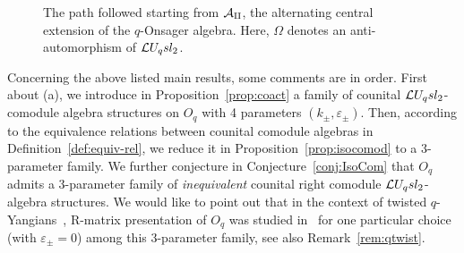 \documentclass[11pt]{amsart}
\numberwithin{equation}{section}
\numberwithin{equation}{section}
\begin{document}
\begin{figure}
	\caption{The path followed starting from $\cal A_q$, the alternating central extension of the $q$-Onsager algebra. Here, $\Omega$ denotes an anti-automorphism of $\mathcal{L} U_q sl_2$.}
		\label{fig:overview}
	\end{figure}
 
Concerning the above listed  main results, some comments are in order. 
First about (a), we introduce in Proposition~\ref{prop:coact} a family of counital $\mathcal{L} U_q sl_2$-comodule algebra structures on $O_q$ with 4 parameters $(k_\pm,\varepsilon_\pm)$. Then, according to the equivalence relations between counital comodule algebras in Definition~\ref{def:equiv-rel}, we reduce it in Proposition~\ref{prop:isocomod} to a  3-parameter family. 
 We further conjecture in Conjecture~\ref{conj:IsoCom} that $O_q$ admits a 3-parameter family of \textit{inequivalent} counital right comodule $\mathcal{L} U_q sl_2$-algebra structures.
We would like to point out that in the context of twisted $q$-Yangians~\cite{MRS02}, R-matrix presentation of $O_q$  was studied in~\cite{Lu23} for one particular choice (with $\varepsilon_\pm=0$) among this 3-parameter family, see also Remark~\ref{rem:qtwist}.
\end{document}
